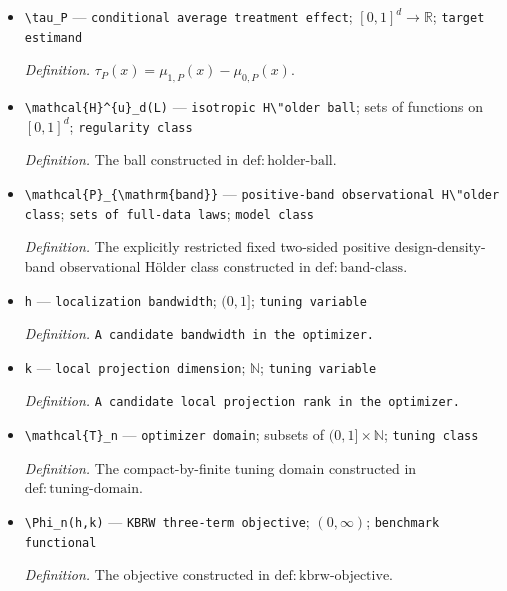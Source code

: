 \documentclass{article}
\begin{document}
\begin{itemize}
  \item \texttt{\textbackslash{}\allowbreak{}tau\_\allowbreak{}P} --- \texttt{conditional average treatment effect}; \([0,1]^d\to\mathbb{R}\); \texttt{target estimand}
  \par\smallskip\noindent\emph{Definition.} \(\tau_P(x)=\mu_{1,P}(x)-\mu_{0,P}(x)\).
  \item \texttt{\textbackslash{}\allowbreak{}mathcal\{H\}\allowbreak{}\textasciicircum{}\{u\}\allowbreak{}\_\allowbreak{}d(L)} --- \texttt{isotropic H\textbackslash{}\allowbreak{}"older ball}; sets of functions on \([0,1]^d\); \texttt{regularity class}
  \par\smallskip\noindent\emph{Definition.} The ball constructed in \(\mathrm{def:holder\mbox{-}ball}\).
  \item \texttt{\textbackslash{}\allowbreak{}mathcal\{P\}\allowbreak{}\_\allowbreak{}\{\textbackslash{}\allowbreak{}mathrm\{band\}\allowbreak{}\}\allowbreak{}} --- \texttt{positive-\allowbreak{}band observational H\textbackslash{}\allowbreak{}"older class}; \texttt{sets of full-\allowbreak{}data laws}; \texttt{model class}
  \par\smallskip\noindent\emph{Definition.} The explicitly restricted fixed two-sided positive design-density-band observational H\"older class constructed in \(\mathrm{def:band\mbox{-}class}\).
  \item \texttt{h} --- \texttt{localization bandwidth}; \((0,1]\); \texttt{tuning variable}
  \par\smallskip\noindent\emph{Definition.} \texttt{A candidate bandwidth in the optimizer.}
  \item \texttt{k} --- \texttt{local projection dimension}; \(\mathbb{N}\); \texttt{tuning variable}
  \par\smallskip\noindent\emph{Definition.} \texttt{A candidate local projection rank in the optimizer.}
  \item \texttt{\textbackslash{}\allowbreak{}mathcal\{T\}\allowbreak{}\_\allowbreak{}n} --- \texttt{optimizer domain}; subsets of \((0,1]\times\mathbb{N}\); \texttt{tuning class}
  \par\smallskip\noindent\emph{Definition.} The compact-by-finite tuning domain constructed in \(\mathrm{def:tuning\mbox{-}domain}\).
  \item \texttt{\textbackslash{}\allowbreak{}Phi\_\allowbreak{}n(h,\allowbreak{}k)} --- \texttt{KBRW three-\allowbreak{}term objective}; \((0,\infty)\); \texttt{benchmark functional}
  \par\smallskip\noindent\emph{Definition.} The objective constructed in \(\mathrm{def:kbrw\mbox{-}objective}\).

\end{itemize}
\end{document}
